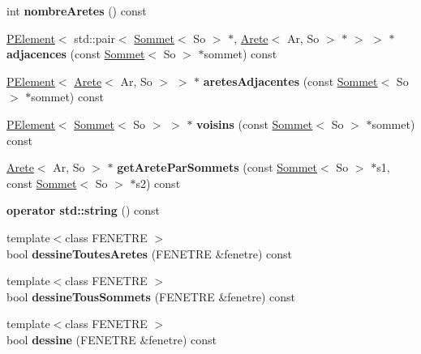 \begin{DoxyCompactItemize}
int {\bfseries nombre\+Aretes} () const
\item 
\mbox{\label{class_graphe_a1af8c87b519030bfe3618dbbdfb25b14}} 
\mbox{\hyperlink{class_p_element}{P\+Element}}$<$ std\+::pair$<$ \mbox{\hyperlink{class_sommet}{Sommet}}$<$ So $>$ $\ast$, \mbox{\hyperlink{class_arete}{Arete}}$<$ Ar, So $>$ $\ast$ $>$ $>$ $\ast$ {\bfseries adjacences} (const \mbox{\hyperlink{class_sommet}{Sommet}}$<$ So $>$ $\ast$sommet) const
\item 
\mbox{\label{class_graphe_a59b0fd34274a0f17df49dd59a546272e}} 
\mbox{\hyperlink{class_p_element}{P\+Element}}$<$ \mbox{\hyperlink{class_arete}{Arete}}$<$ Ar, So $>$ $>$ $\ast$ {\bfseries aretes\+Adjacentes} (const \mbox{\hyperlink{class_sommet}{Sommet}}$<$ So $>$ $\ast$sommet) const
\item 
\mbox{\label{class_graphe_acc4971337a3af5b823afec6969d96409}} 
\mbox{\hyperlink{class_p_element}{P\+Element}}$<$ \mbox{\hyperlink{class_sommet}{Sommet}}$<$ So $>$ $>$ $\ast$ {\bfseries voisins} (const \mbox{\hyperlink{class_sommet}{Sommet}}$<$ So $>$ $\ast$sommet) const
\item 
\mbox{\label{class_graphe_a7627cce988794442b1eca7709d77194a}} 
\mbox{\hyperlink{class_arete}{Arete}}$<$ Ar, So $>$ $\ast$ {\bfseries get\+Arete\+Par\+Sommets} (const \mbox{\hyperlink{class_sommet}{Sommet}}$<$ So $>$ $\ast$s1, const \mbox{\hyperlink{class_sommet}{Sommet}}$<$ So $>$ $\ast$s2) const
\item 
\mbox{\label{class_graphe_a25310143fb14a646cef18ad756618312}} 
{\bfseries operator std\+::string} () const
\item 
\mbox{\label{class_graphe_a518e2e51223c5afe6e875ee682fe5d6b}} 
{\footnotesize template$<$class F\+E\+N\+E\+T\+RE $>$ }\\bool {\bfseries dessine\+Toutes\+Aretes} (F\+E\+N\+E\+T\+RE \&fenetre) const
\item 
\mbox{\label{class_graphe_a3bddb6d11f19ae9152a7489c239e8f99}} 
{\footnotesize template$<$class F\+E\+N\+E\+T\+RE $>$ }\\bool {\bfseries dessine\+Tous\+Sommets} (F\+E\+N\+E\+T\+RE \&fenetre) const
\item 
\mbox{\label{class_graphe_a265ca249fcf400c43b5dfb3a1e7886c3}} 
{\footnotesize template$<$class F\+E\+N\+E\+T\+RE $>$ }\\bool {\bfseries dessine} (F\+E\+N\+E\+T\+RE \&fenetre) const
\end{DoxyCompactItemize}
